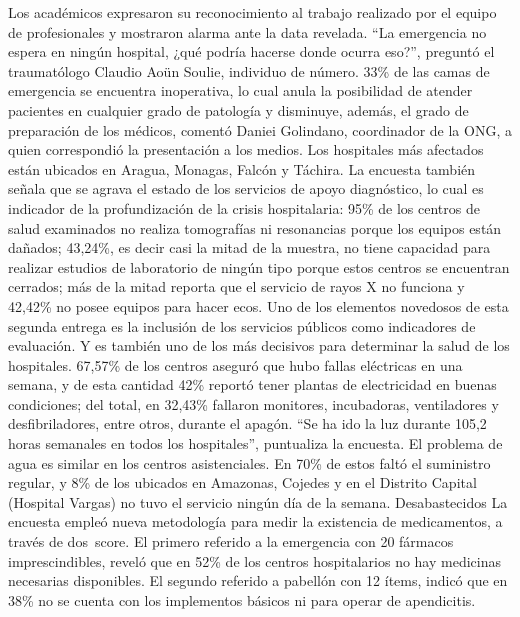 \documentclass{article}%
\begin{document}
%
Los académicos expresaron su reconocimiento al trabajo realizado por el equipo de profesionales y mostraron alarma ante la data revelada. “La emergencia no espera en ningún hospital, ¿qué podría hacerse donde ocurra eso?”, preguntó el traumatólogo Claudio Aoün Soulie, individuo de número.%
\newline%
%
33\% de las camas de emergencia se encuentra inoperativa, lo cual anula la posibilidad de atender pacientes en cualquier grado de patología y disminuye, además, el grado de preparación de los médicos, comentó Daniei Golindano, coordinador de la ONG, a quien correspondió la presentación a los medios. Los hospitales más afectados están ubicados en Aragua, Monagas, Falcón y Táchira.%
\newline%
%
La encuesta también señala que se agrava el estado de los servicios de apoyo diagnóstico, lo cual es indicador de la profundización de la crisis hospitalaria: 95\% de los centros de salud examinados no realiza tomografías ni resonancias porque los equipos están dañados; 43,24\%, es decir casi la mitad de la muestra, no tiene capacidad para realizar estudios de laboratorio de ningún tipo porque estos centros se encuentran cerrados; más de la mitad reporta que el servicio de rayos X no funciona y 42,42\% no posee equipos para hacer ecos.%
\newline%
%
Uno de los elementos novedosos de esta segunda entrega es la inclusión de los servicios públicos como indicadores de evaluación. Y es también uno de los más decisivos para determinar la salud de los hospitales. 67,57\% de los centros aseguró que hubo fallas eléctricas en una semana, y de esta cantidad 42\% reportó tener plantas de electricidad en buenas condiciones; del total, en 32,43\% fallaron monitores, incubadoras, ventiladores y desfibriladores, entre otros, durante el apagón.%
\newline%
%
“Se ha ido la luz durante 105,2 horas semanales en todos los hospitales”, puntualiza la encuesta.%
\newline%
%
El problema de agua es similar en los centros asistenciales. En 70\% de estos faltó el suministro regular, y 8\% de los ubicados en Amazonas, Cojedes y en el Distrito Capital (Hospital Vargas) no tuvo el servicio ningún día de la semana.%
\newline%
%
Desabastecidos%
\newline%
%
La encuesta empleó nueva metodología para medir la existencia de medicamentos, a través de dos~score. El primero referido a la emergencia con 20 fármacos imprescindibles, reveló que en 52\% de los centros hospitalarios no hay medicinas necesarias disponibles. El segundo referido a pabellón con 12 ítems, indicó que en 38\% no se cuenta con los implementos básicos ni para operar de apendicitis.%
\end{document}
